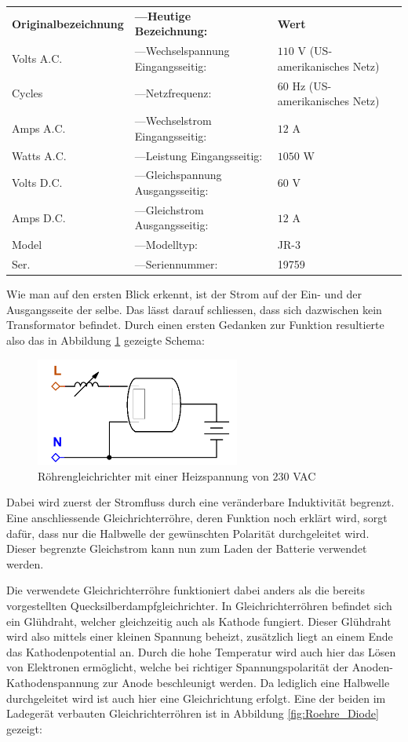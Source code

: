 \begin{tabular}{lll}
	\textbf{Originalbezeichnung} & \textbf{---\quad Heutige Bezeichnung:} & \textbf{Wert} \\
	Volts A.C. & ---\quad Wechselspannung Eingangsseitig: & $110$ V (US-amerikanisches Netz) \\
	Cycles & ---\quad Netzfrequenz: & $60$ Hz (US-amerikanisches Netz)\\
	Amps A.C. & ---\quad Wechselstrom Eingangsseitig: & $12$ A \\
	Watts A.C. & ---\quad Leistung Eingangsseitig: & $1050$ W \\
	Volts D.C. & ---\quad Gleichspannung Ausgangsseitig: & $60$ V \\
	Amps D.C. & ---\quad Gleichstrom Ausgangsseitig: & $12$ A \\
	Model & ---\quad Modelltyp: & JR-3 \\
	Ser. & ---\quad Seriennummer: & 19759
\end{tabular}

Wie man auf den ersten Blick erkennt, ist der Strom auf der Ein- und der Ausgangsseite der selbe. Das lässt darauf schliessen, dass sich dazwischen kein Transformator befindet. Durch einen ersten Gedanken zur Funktion resultierte also das in Abbildung \ref{fig:Ladegeraet1} gezeigte Schema:

\begin{figure}[h]
	\centering
		\includegraphics[width=0.60\textwidth]{images/Ladegeraet_Alt_1.PNG}
	\caption{Röhrengleichrichter mit einer Heizspannung von $230$ VAC}
	\label{fig:Ladegeraet1}
\end{figure}

Dabei wird zuerst der Stromfluss durch eine veränderbare Induktivität begrenzt. Eine anschliessende Gleichrichterröhre, deren Funktion noch erklärt wird, sorgt dafür, dass nur die Halbwelle der gewünschten Polarität durchgeleitet wird. Dieser begrenzte Gleichstrom kann nun zum Laden der Batterie verwendet werden.

Die verwendete Gleichrichterröhre funktioniert dabei anders als die bereits vorgestellten Quecksilberdampfgleichrichter. In Gleichrichterröhren befindet sich ein Glühdraht, welcher gleichzeitig auch als Kathode fungiert. Dieser Glühdraht wird also mittels einer kleinen Spannung beheizt, zusätzlich liegt an einem Ende das Kathodenpotential an. Durch die hohe Temperatur wird auch hier das Lösen von Elektronen ermöglicht, welche bei richtiger Spannungspolarität der Anoden-Kathodenspannung zur Anode beschleunigt werden. Da lediglich eine Halbwelle durchgeleitet wird ist auch hier eine Gleichrichtung erfolgt. Eine der beiden im Ladegerät verbauten Gleichrichterröhren ist in Abbildung \ref{fig:Roehre_Diode} gezeigt: \newpage


